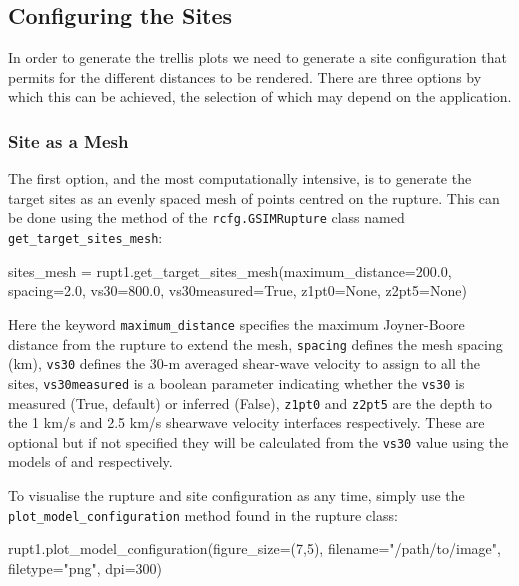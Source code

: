 \subsection{Configuring the Sites}

In order to generate the trellis plots we need to generate a site configuration that permits for the different distances to be rendered. There are three options by which this can be achieved, the selection of which may depend on the application.

\subsubsection{Site as a Mesh}

The first option, and the most computationally intensive, is to generate the target sites as an evenly spaced mesh of points centred on the rupture. This can be done using the method of the \verb=rcfg.GSIMRupture= class named \verb=get_target_sites_mesh=:

\begin{python}
sites_mesh = rupt1.get_target_sites_mesh(maximum_distance=200.0,
                                         spacing=2.0,
                                         vs30=800.0,
                                         vs30measured=True,
                                         z1pt0=None,
                                         z2pt5=None)
\end{python}

Here the keyword \verb=maximum_distance= specifies the maximum Joyner-Boore distance from the rupture to extend the mesh, \verb=spacing= defines the mesh spacing (km), \verb=vs30= defines the 30-m averaged shear-wave velocity to assign to all the sites, \verb=vs30measured= is a boolean parameter indicating whether the \verb=vs30= is measured (True, default) or inferred (False), \verb=z1pt0= and \verb=z2pt5= are the depth to the 1 km/s and 2.5 km/s shearwave velocity interfaces respectively. These are optional but if not specified they will be calculated from the \verb=vs30= value using the models of \cite{AbrahamsonSilva2008} and \cite{CampbellBozorgnia2008} respectively. 

To visualise the rupture and site configuration as any time, simply use the \\ \verb=plot_model_configuration= method found in the rupture class:

\begin{python}
rupt1.plot_model_configuration(figure_size=(7,5),
                               filename="/path/to/image",
                               filetype="png",
                               dpi=300)
\end{python}

